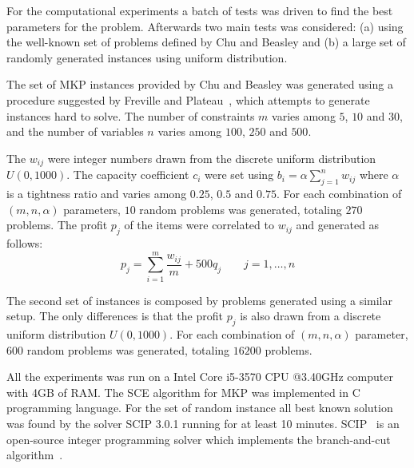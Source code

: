 For the computational experiments a batch of tests was driven to find the best
parameters for the problem.
Afterwards two main tests was considered:
(a) using the well-known set of problems defined by Chu and Beasley \cite{Chu-Beasley-1998}
and (b) a large set of randomly generated instances using uniform distribution.


The set of MKP instances provided by Chu and Beasley was generated using a
procedure suggested by Freville and Plateau~\cite{freville1994efficient}, which
attempts to generate instances hard to solve.
The number of constraints $m$ varies among $5$, $10$ and $30$, and the number
of variables $n$ varies among $100$, $250$ and $500$.

The $w_{ij}$ were integer numbers drawn from the discrete uniform distribution
$U(0, 1000)$.
The capacity coefficient $c_i$ were set using
$b_i = \alpha\sum_{j=1}^{n} w_{ij}$ where $\alpha$ is a tightness ratio and
varies among $0.25$, $0.5$ and $0.75$.
For each combination of $(m,n,\alpha)$ parameters, $10$ random problems was generated,
totaling $270$ problems.
The profit $p_j$ of the items were correlated to $w_{ij}$ and generated as follows:
\begin{displaymath}
  p_j = \sum_{i=1}^m \frac{w_{ij}}{m} + 500q_j \qquad j = 1, \ldots, n
\end{displaymath}


The second set of instances is composed by problems generated using a similar
setup.
The only differences is that the profit $p_j$ is also drawn from a discrete uniform
distribution $U(0, 1000)$.
For each combination of $(m, n, \alpha)$ parameter, $600$ random problems was
generated, totaling $16200$ problems.


All the experiments was run on a Intel Core i5-3570 CPU @3.40GHz computer
with 4GB of RAM.
The SCE algorithm for MKP was implemented in C programming language.
For the set of random instance all best known solution was found by the solver
SCIP 3.0.1 running for at least 10 minutes.
SCIP~\cite{Achterberg2009} is an open-source integer programming solver which
implements the branch-and-cut algorithm~\cite{padberg1991branch}.

